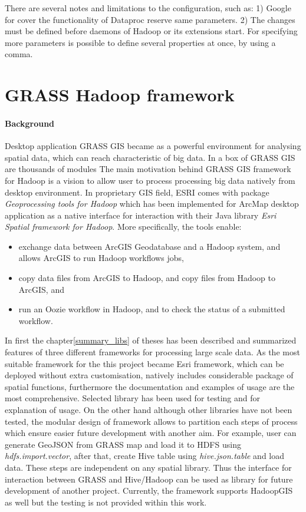 \documentclass[a4paper,12pt,oneside]{report}
\begin{document}
There are several notes and limitations  to the configuration, such as: 1) Google for cover the functionality of Dataproc reserve  same parameters. 2) The changes must be defined before daemons of Hadoop or its extensions start.  For specifying more parameters is possible to define several properties at once, by using a comma.




        
\section{GRASS Hadoop framework}
\paragraph{Background}
Desktop application GRASS GIS became as a powerful environment for analysing spatial data, which can 
reach characteristic of big data. In a box of GRASS GIS are thousands of modules   The main motivation 
behind GRASS GIS framework for Hadoop is a vision to allow user to process processing big data natively from desktop environment. In proprietary GIS field, ESRI comes with package \textit{Geoprocessing tools for Hadoop}\cite{esri_gtfp} 
which has been implemented for ArcMap desktop application as a native interface for interaction with 
their Java library \textit{Esri Spatial framework for Hadoop}. More specifically, the tools enable:

\begin{itemize}
\item exchange data between ArcGIS Geodatabase and a Hadoop system, and allows ArcGIS to run Hadoop workflows jobs,
\item copy data files from ArcGIS to Hadoop, and copy files from Hadoop to ArcGIS, and 
\item run an Oozie workflow in Hadoop, and to check the status of a submitted workflow.
\end{itemize}
 
 
In first the chapter\ref{summary_libs} of theses has been described and summarized features of three different frameworks for processing large scale data. 
As the most suitable framework for the this project became Esri framework, which can be deployed without extra customisation, natively includes considerable package of spatial functions, furthermore the documentation  and examples of usage are  the most comprehensive. Selected library has been used for testing and for explanation of usage. On the other hand although other libraries have not been tested, the modular design of framework allows to partition each steps of process which ensure easier future development with another aim. For example, user can generate GeoJSON from GRASS map and load it  to HDFS using \textit{hdfs.import.vector}, after that, create Hive table using \textit{hive.json.table} and load data. These steps are independent on any spatial library. Thus the interface for interaction between GRASS and Hive/Hadoop can be used as library for future development of another project. Currently, the framework supports HadoopGIS as well but the testing is not provided within this work.
 
\end{document}
